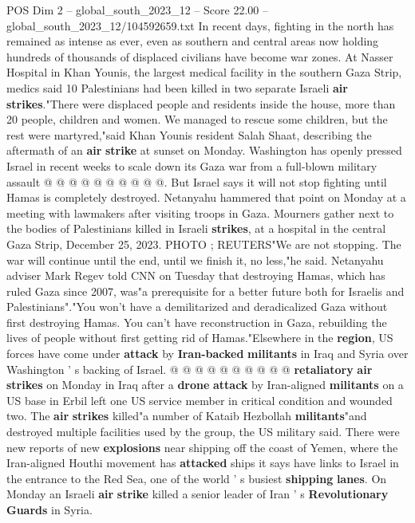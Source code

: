 \begin{textsample}{POS Dim 2 – global\_south\_2023\_12 – Score 22.00 – global\_south\_2023\_12/104592659.txt}
In recent days, fighting in the north has remained as intense as ever, even as southern and central areas now holding hundreds of thousands of displaced civilians have become war zones.
At Nasser Hospital in Khan Younis, the largest medical facility in the southern Gaza Strip, medics said 10 Palestinians had been killed in two separate Israeli \textbf{air} \textbf{strikes}."There were displaced people and residents inside the house, more than 20 people, children and women.
We managed to rescue some children, but the rest were martyred,"said Khan Younis resident Salah Shaat, describing the aftermath of an \textbf{air} \textbf{strike} at sunset on Monday.
Washington has openly pressed Israel in recent weeks to scale down its Gaza war from a full-blown military assault @ @ @ @ @ @ @ @ @ @.
But Israel says it will not stop fighting until Hamas is completely destroyed.
Netanyahu hammered that point on Monday at a meeting with lawmakers after visiting troops in Gaza.
Mourners gather next to the bodies of Palestinians killed in Israeli \textbf{strikes}, at a hospital in the central Gaza Strip, December 25, 2023.
PHOTO ; REUTERS"We are not stopping.
The war will continue until the end, until we finish it, no less,"he said.
Netanyahu adviser Mark Regev told CNN on Tuesday that destroying Hamas, which has ruled Gaza since 2007, was"a prerequisite for a better future both for Israelis and Palestinians"."You won't have a demilitarized and deradicalized Gaza without first destroying Hamas.
You can't have reconstruction in Gaza, rebuilding the lives of people without first getting rid of Hamas."Elsewhere in the \textbf{region}, US forces have come under \textbf{attack} by \textbf{Iran-backed} \textbf{militants} in Iraq and Syria over Washington ' s backing of Israel. @ @ @ @ @ @ @ @ @ @ \textbf{retaliatory} \textbf{air} \textbf{strikes} on Monday in Iraq after a \textbf{drone} \textbf{attack} by Iran-aligned \textbf{militants} on a US base in Erbil left one US service member in critical condition and wounded two.
The \textbf{air} \textbf{strikes} killed"a number of Kataib Hezbollah \textbf{militants}"and destroyed multiple facilities used by the group, the US military said.
There were new reports of new \textbf{explosions} near shipping off the coast of Yemen, where the Iran-aligned Houthi movement has \textbf{attacked} ships it says have links to Israel in the entrance to the Red Sea, one of the world ' s busiest \textbf{shipping} \textbf{lanes}.
On Monday an Israeli \textbf{air} \textbf{strike} killed a senior leader of Iran ' s \textbf{Revolutionary} \textbf{Guards} in Syria.

\end{textsample}
